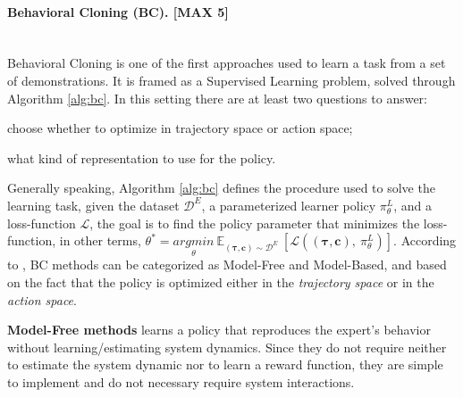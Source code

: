 \paragraph{Behavioral Cloning (BC). [MAX 5]} \mbox{} \\ 
Behavioral Cloning is one of the first approaches used to learn a task from a set of demonstrations. It is framed as a Supervised Learning problem, solved through Algorithm \ref{alg:bc}. In this setting there are at least two questions to answer: 
\begin{enumerate*}[label=\textbf{(\arabic*)}]
    \item choose whether to optimize in trajectory space or action space;
    \item what kind of representation to use for the policy.
\end{enumerate*}
Generally speaking, Algorithm \ref{alg:bc} defines the procedure used to solve the learning task, given the dataset $\mathcal{D}^{E}$, a parameterized learner policy $\pi^{L}_{\theta}$, and a loss-function $\mathcal{L}$, the goal is to find the policy parameter that minimizes the loss-function, in other terms, $\theta^{*} = \underset{\theta}{argmin} \ \mathbb{E}_{(\boldsymbol{\tau}, \mathbf{c}) \sim \mathcal{D}^{E}} \ [\mathcal{L}((\boldsymbol{\tau}, \mathbf{c}), \ \pi^{L}_{\theta})]$.
\newline According to \cite{osa2018algorithmic}, BC methods can be categorized as Model-Free and Model-Based, and based on the fact that the policy is optimized either in the \textit{trajectory space} or in the \textit{action space}. 
 

\textbf{Model-Free methods} learns a policy that reproduces the expert's behavior without learning/estimating system dynamics. Since they do not require neither to estimate the system dynamic nor to learn a reward function, they are simple to implement and do not necessary require system  interactions. 

